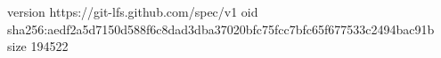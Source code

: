 version https://git-lfs.github.com/spec/v1
oid sha256:aedf2a5d7150d588f6c8dad3dba37020bfc75fcc7bfc65f677533c2494bac91b
size 194522
